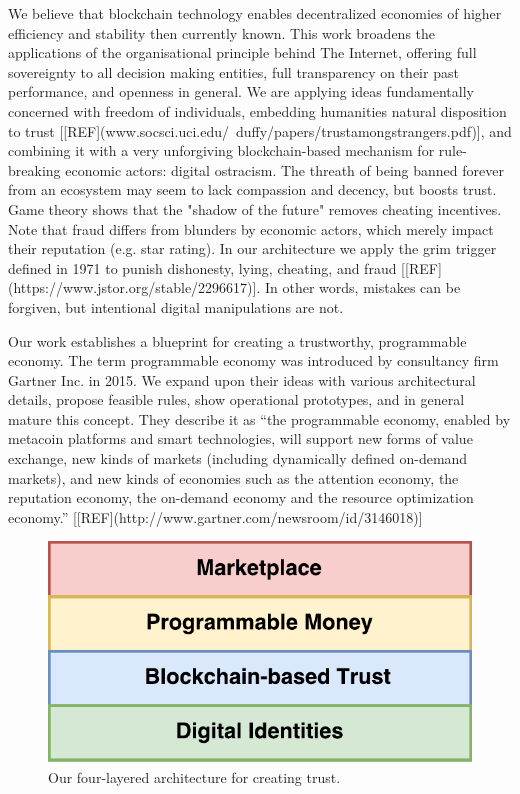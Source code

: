 \documentclass[USenglish]{article}
\begin{document}
We believe that blockchain technology enables decentralized economies of higher efficiency and stability then currently known. 
This work broadens the applications of the organisational principle behind The Internet, offering full sovereignty to all decision making entities, full transparency on their past performance, and openness in general.
We are applying ideas fundamentally concerned with freedom of individuals, embedding humanities natural disposition to trust [[REF](www.socsci.uci.edu/~duffy/papers/trustamongstrangers.pdf)], and combining it with a very unforgiving blockchain-based mechanism for rule-breaking economic actors: digital ostracism. 
The threath of being banned forever from an ecosystem may seem to lack compassion and decency, but boosts trust. 
Game theory shows that the "shadow of the future" removes cheating incentives.
Note that fraud differs from blunders by economic actors, which merely impact their reputation (e.g. star rating).
In our architecture we apply the grim trigger defined in 1971 to punish dishonesty, lying, cheating, and fraud [[REF](https://www.jstor.org/stable/2296617)].
In other words, mistakes can be forgiven, but intentional digital manipulations are not.

Our work establishes a blueprint for creating a trustworthy, programmable economy.
The term programmable economy was introduced by consultancy firm Gartner Inc. in 2015. 
We expand upon their ideas with various architectural details, propose feasible rules, show operational prototypes, and in general mature this concept.
They describe it as ``the programmable economy, enabled by metacoin platforms and smart technologies, will support new forms of value exchange, new kinds of markets (including dynamically defined on-demand markets), and new kinds of economies such as the attention economy, the reputation economy, the on-demand economy and the resource optimization economy.'' [[REF](http://www.gartner.com/newsroom/id/3146018)]

\begin{figure}[t]
	\centering
	\includegraphics[width=1\columnwidth]{assets/tech_stack_simple}
	\caption{Our four-layered architecture for creating trust.}
	\label{fig:tech_stack_simple}
\end{figure}
\end{document}

